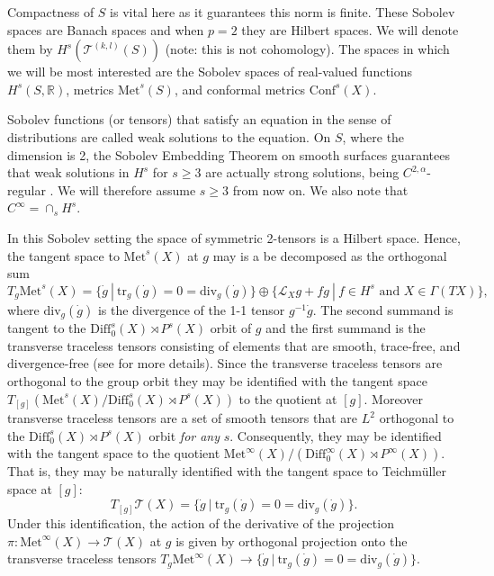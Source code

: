 \documentclass{amsart}
\newcommand{\R}{\mathbb{R}}
\begin{document}
Compactness of $S$ is vital here as it guarantees this norm is finite. 
These Sobolev spaces are Banach spaces and when $p = 2$ they are Hilbert spaces. 
We will denote them by $H^s(\mathscr{T}^{(k,l)}(S))$ (note: this is not cohomology). 
The spaces in which we will be most interested are the Sobolev spaces of real-valued functions $H^s(S,\R)$, metrics $\mathrm{Met}^s(S)$, and conformal metrics $\mathrm{Conf}^s(X)$.

Sobolev functions (or tensors) that satisfy an equation in the sense of distributions are called weak solutions to the equation. 
On $S$, where the dimension is 2, the Sobolev Embedding Theorem on smooth surfaces guarantees that weak solutions in $H^s$ for $s \geq 3$ are actually strong solutions, being $C^{2,\alpha}$-regular \cite{aubin1982}. 
We will therefore assume $s \geq 3$ from now on. 
We also note that $C^\infty = \cap_s H^s$.


In this Sobolev setting the space of symmetric 2-tensors is a Hilbert space. Hence, the tangent space to $\mathrm{Met}^s(X)$ at $g$ may is a be decomposed as the orthogonal sum
\[
T_g \mathrm{Met}^s(X) = \{\dot{g} \ | \ \mathrm{tr}_g (\dot{g}) = 0 = \mathrm{div}_g(\dot{g}) \} \oplus \{\mathcal{L}_X g + fg \ |\ f \in H^s \text{ and } X \in \Gamma(TX) \},
\] 
where $\mathrm{div}_g(\dot{g})$ is the divergence of the 1-1 tensor $g^{-1}\dot{g}$. 
The second summand is tangent to the $\mathrm{Diff}_0^s(X) \rtimes P^s(X)$ orbit of $g$ and the first summand is the transverse traceless tensors consisting of elements that are smooth, trace-free, and divergence-free (see \cite{fischer-marsden1975} for more details). 
Since the transverse traceless tensors are orthogonal to the group orbit they may be identified with the tangent space $T_{[g]} \left( \mathrm{Met}^s(X)/ \mathrm{Diff}_0^s(X) \rtimes P^s(X) \right)$ to the quotient at $[g]$. 
Moreover transverse traceless tensors are a set of smooth tensors that are $L^2$ orthogonal to the $\mathrm{Diff}_0^s(X) \rtimes P^s(X)$ orbit \textit{for any} $s$. 
Consequently, they may be identified with the tangent space to the quotient $\mathrm{Met}^\infty(X)/(\mathrm{Diff}_0^\infty(X) \rtimes P^\infty(X))$. 
That is, they may be naturally identified with the tangent space to Teichm\"uller space at $[g]$:
\[
T_{[g]} \mathcal{T}(X) = \{\dot{g} \ | \ \mathrm{tr}_g (\dot{g}) = 0 = \mathrm{div}_g(\dot{g}) \}.
\]
Under this identification, the action of the derivative of the projection $\pi: \mathrm{Met}^\infty(X) \to \mathcal{T}(X)$ at $g$ is given by orthogonal projection onto the transverse traceless tensors $T_g \mathrm{Met}^\infty(X) \to \{\dot{g} \ | \ \mathrm{tr}_g (\dot{g}) = 0 = \mathrm{div}_g(\dot{g}) \}$.
\end{document}
